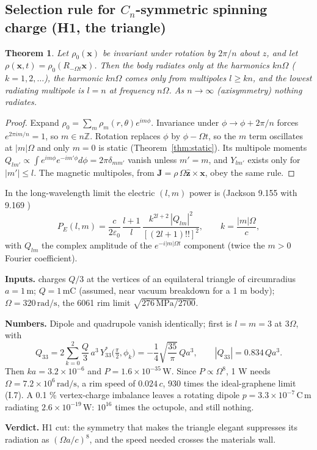 \documentclass[10pt,a4paper]{article}
\newcommand{\e}[1]{\times10^{#1}}
\newcommand{\un}[1]{\,\mathrm{#1}}
\newcommand{\meta}[1]{\par\noindent{\small\textsf{\color{black!60}#1}}\par\smallskip}
\newcommand{\verdict}[1]{\par\smallskip\noindent\textbf{Verdict.} #1\par}
\newcommand{\inputs}[1]{\par\noindent\textbf{Inputs.} #1\par}
\newcommand{\nums}[1]{\par\noindent\textbf{Numbers.} #1\par}
\theoremstyle{plain}
\newtheorem{theorem}{Theorem}
\theoremstyle{definition}
\begin{document}
\subsection{Selection rule for $C_n$-symmetric spinning charge (H1, the triangle)}
\meta{[P] run 3 $\cdot$ hypothesis H1 $\cdot$ from II.2, II.4}
\begin{theorem}\label{thm:cn}
Let $\rho_0(\mathbf x)$ be invariant under rotation by $2\pi/n$ about $z$, and let $\rho(\mathbf x,t)=\rho_0(R_{-\Omega t}\mathbf x)$. Then the
body radiates only at the harmonics $kn\Omega$ ($k=1,2,\dots$), the harmonic $kn\Omega$ comes only from multipoles $l\ge kn$, and the lowest
radiating multipole is $l=n$ at frequency $n\Omega$. As $n\to\infty$ (axisymmetry) nothing radiates.
\end{theorem}
\begin{proof}
Expand $\rho_0=\sum_m\rho_m(r,\theta)e^{im\phi}$. Invariance under $\phi\to\phi+2\pi/n$ forces $e^{2\pi im/n}=1$, so $m\in n\mathbb Z$. Rotation
replaces $\phi$ by $\phi-\Omega t$, so the $m$ term oscillates at $|m|\Omega$ and only $m=0$ is static (Theorem~\ref{thm:static}). Its multipole
moments $Q_{lm'}\propto\int e^{im\phi}e^{-im'\phi}d\phi=2\pi\delta_{mm'}$ vanish unless $m'=m$, and $Y_{lm'}$ exists only for $|m'|\le l$. The
magnetic multipoles, from $\mathbf J=\rho\,\Omega\hat{\mathbf z}\times\mathbf x$, obey the same rule.
\end{proof}
\noindent In the long-wavelength limit the electric $(l,m)$ power is (Jackson 9.155 with 9.169 \cite{jackson})
\begin{equation}
P_E(l,m)=\frac{c}{2\varepsilon_0}\,\frac{l+1}{l}\,\frac{k^{2l+2}\,|Q_{lm}|^2}{[(2l+1)!!]^2},\qquad k=\frac{|m|\Omega}{c},\label{eq:multipole}
\end{equation}
with $Q_{lm}$ the complex amplitude of the $e^{-i|m|\Omega t}$ component (twice the $m>0$ Fourier coefficient).
\inputs{charges $Q/3$ at the vertices of an equilateral triangle of circumradius $a=1\un{m}$; $Q=1\un{mC}$ (assumed, near vacuum
breakdown for a 1 m body); $\Omega=320\un{rad/s}$, the 6061 rim limit $\sqrt{276\un{MPa}/2700}$.}
\nums{Dipole and quadrupole vanish identically; first is $l=m=3$ at $3\Omega$, with
\[
Q_{33}=2\sum_{k=0}^{2}\frac Q3\,a^3\,Y^*_{33}\big(\tfrac\pi2,\phi_k\big)=-\frac14\sqrt{\frac{35}{\pi}}\,Qa^3,\qquad |Q_{33}|=0.834\,Qa^3 .
\]
Then $ka=3.2\e{-6}$ and
$P=1.6\e{-35}\un{W}$. Since $P\propto\Omega^8$, 1 W needs $\Omega=7.2\e6\un{rad/s}$, a rim speed of $0.024\,c$, 930 times the ideal-graphene
limit (I.7). A 0.1 \% vertex-charge imbalance leaves a rotating dipole $p=3.3\e{-7}\un{C\,m}$ radiating $2.6\e{-19}\un{W}$:
$10^{16}$ times the octupole, and still nothing.}
\verdict{H1 cut: the symmetry that makes the triangle elegant suppresses its radiation as $(\Omega a/c)^8$, and the speed needed crosses the
materials wall.}
\end{document}
